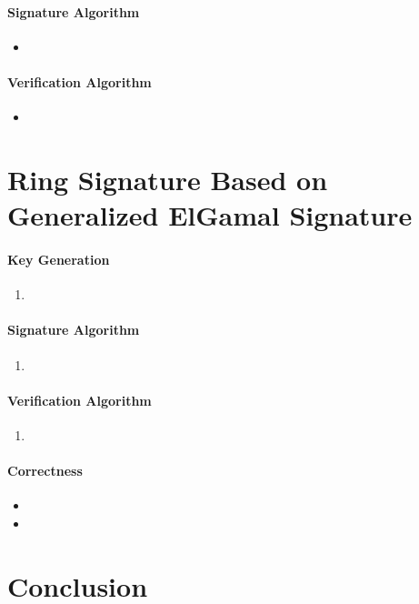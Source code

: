 \documentclass[a4paper,11pt]{article}
\begin{document}
\paragraph{Signature Algorithm}

    \begin{itemize}
      \item 
    \end{itemize}

\paragraph{Verification Algorithm}
    
    \begin{itemize}
      \item 
    \end{itemize}


\section{Ring Signature Based on Generalized ElGamal Signature}\label{sec:four}

\paragraph{Key Generation}

\begin{enumerate}
    \item 
\end{enumerate}

\paragraph{Signature Algorithm}
     

\begin{enumerate}
    \item 
\end{enumerate}

\paragraph{Verification Algorithm}
    
\begin{enumerate}
    \item 
\end{enumerate}

\paragraph{Correctness}
    \begin{itemize}
      \item 

      \item 
    \end{itemize}

\section*{\textbf{Conclusion}}



\end{document}
